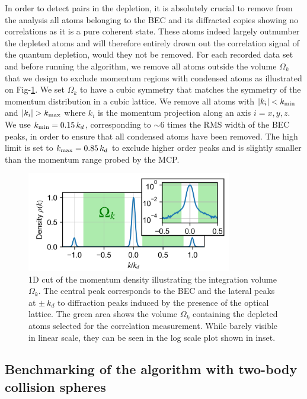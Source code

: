 In order to detect \kmk pairs in the depletion, it is absolutely crucial to remove from the analysis all atoms belonging to the BEC and its diffracted copies showing no correlations as it is a pure coherent state. These atoms indeed largely outnumber the depleted atoms and will therefore entirely drown out the \kmk correlation signal of the quantum depletion, would they not be removed. 
For each recorded data set and before running the algorithm, we remove all atoms outside the volume $\Omega_k$ that we design to exclude momentum regions with condensed atoms as illustrated on Fig-\ref{fig:omega_k}. We set $\Omega_k$ to have a cubic symmetry that matches the symmetry of the momentum distribution in a cubic lattice. We remove all atoms with $|k_i| < k_{\rm{min}}$ and $|k_i| > k_{\rm{max}}$ where $k_i$ is the momentum projection along an axis $i=x,y,z$. We use $k_{\rm{min}}=0.15 \, k_d$, corresponding to $\sim 6$ times the RMS width of the BEC peaks, in order to ensure that all condensed atoms have been removed. The high limit is set to $k_{\rm{max}}=0.85 \, k_d$ to exclude higher order peaks and is slightly smaller than the momentum range probed by the MCP.

\begin{figure}
    \centering
    \includegraphics[width=0.8\textwidth]{Fig/Chapter4/densite.png}
    \caption{1D cut of the momentum density illustrating the integration volume $\Omega_k$. The central peak corresponds to the BEC and the lateral peaks at $\pm \ k_d$ to diffraction peaks induced by the presence of the optical lattice. The green area shows the volume $\Omega_k$ containing the depleted atoms selected for the correlation measurement. While barely visible in linear scale, they can be seen in the log scale plot shown in inset.}
    \label{fig:omega_k}
\end{figure}


\subsection{Benchmarking of the algorithm with two-body collision spheres}

